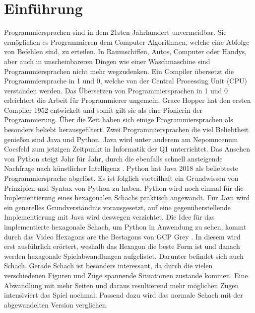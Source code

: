 \chapter{Einführung}
Programmiersprachen sind in dem 21sten Jahrhundert unvermeidbar. Sie ermöglichen es Programmieren dem Computer Algorithmen, welche eine Abfolge von Befehlen sind, zu erteilen. In Raumschiffen, Autos, Computer oder Handys, aber auch in unscheinbareren Dingen wie einer Waschmaschine sind Programmiersprachen nicht mehr wegzudenken. Ein Compiler übersetzt die Programmiersprache in 1 und 0, welche von der Central Processing Unit (CPU) verstanden werden. Das Übersetzen von Programmiersprachen in 1 und 0 erleichtert die Arbeit für Programmierer ungemein. Grace Hopper hat den ersten Compiler 1952 entwickelt und somit gilt sie als eine Pionierin der Programmierung. Über die Zeit haben sich einige Programmiersprachen als besonders beliebt herausgefiltert. Zwei Programmiersprachen die viel Beliebtheit genießen sind Java und Python. Java wird unter anderem am Nepomucenum Coesfeld zum jetzigen Zeitpunkt in Informatik der Q1 unterrichtet. Das Ansehen von Python steigt Jahr für Jahr, durch die ebenfalls schnell ansteigende Nachfrage nach künstlicher Intelligenz \cite{Gray:2017}. Python hat Java 2018 als beliebteste Programmiersprache abgelöst. Es ist folglich vorteilhaft ein Grundwissen von Prinzipien und Syntax von Python zu haben. Python wird noch einmal für die Implementierung eines hexagonalen Schachs praktisch angewandt. Für Java wird ein generelles Grundverständnis vorausgesetzt, auf eine gegenüberstellende Implementierung mit Java wird deswegen verzichtet. Die Idee für das implementierte hexagonale Schach, um Python in Anwendung zu sehen, kommt durch das Video Hexagons are the Bestagons von GCP Grey \cite{Grey:Bestagons}. In diesem wird erst ausführlich erörtert, weshalb das Hexagon die beste Form ist und danach werden hexagonale Spielabwandlungen aufgelistet. Darunter befindet sich auch Schach. Gerade Schach ist besonders interessant, da durch die vielen verschiedenen Figuren und Züge spannende Situationen zustande kommen. Eine Abwandlung mit mehr Seiten und daraus resultierend mehr möglichen Zügen intensiviert das Spiel nochmal. Passend dazu wird das normale Schach mit der abgewandelten Version verglichen. \cite{Github:PYPL}\cite{Louis:2010}
